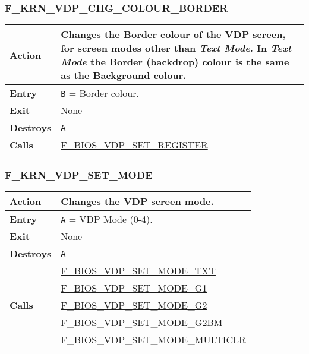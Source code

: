     \subsubsection{F\_KRN\_VDP\_CHG\_COLOUR\_BORDER}
    \label{func:fkrnvdpchgcolourborder}
    \begin{tabular}{l p{15cm}}
        \hline\textbf{Action}
        & Changes the Border colour of the \textbf{VDP} screen, for screen
        modes other than \textit{Text Mode}. In \textit{Text Mode} the
        Border (backdrop) colour is the same as the Background colour.\\
        \hline\textbf{Entry} & \texttt{B} = Border colour.\\
        \hline\textbf{Exit} & None\\
        \hline\textbf{Destroys} & \texttt{A}\\
        \hline\textbf{Calls}
        & \hyperref[func:fbiosvdpsetregister]{F\_BIOS\_VDP\_SET\_REGISTER}\\
        \hline
    \end{tabular}

    \subsubsection{F\_KRN\_VDP\_SET\_MODE}
    \label{func:fkrnvdpsetmode}
    \begin{tabular}{l p{15cm}}
        \hline\textbf{Action}
        & Changes the \textbf{VDP} screen mode.\\
        \hline\textbf{Entry} & \texttt{A} = VDP Mode (0-4).\\
        \hline\textbf{Exit} & None\\
        \hline\textbf{Destroys} & \texttt{A}\\
        \hline\multirow[t]{5}{4em}{\textbf{Calls}}
        & \hyperref[func:fbiosvdpsetmodetxt]{F\_BIOS\_VDP\_SET\_MODE\_TXT}\\
        & \hyperref[func:fbiosvdpsetmodeg1]{F\_BIOS\_VDP\_SET\_MODE\_G1}\\
        & \hyperref[func:fbiosvdpsetmodeg2]{F\_BIOS\_VDP\_SET\_MODE\_G2}\\
        & \hyperref[func:fbiosvdpsetmodeg2bm]{F\_BIOS\_VDP\_SET\_MODE\_G2BM}\\
        & \hyperref[func:fbiosvdpsetmodemulticlr]{F\_BIOS\_VDP\_SET\_MODE\_MULTICLR}\\
        \hline
    \end{tabular}

